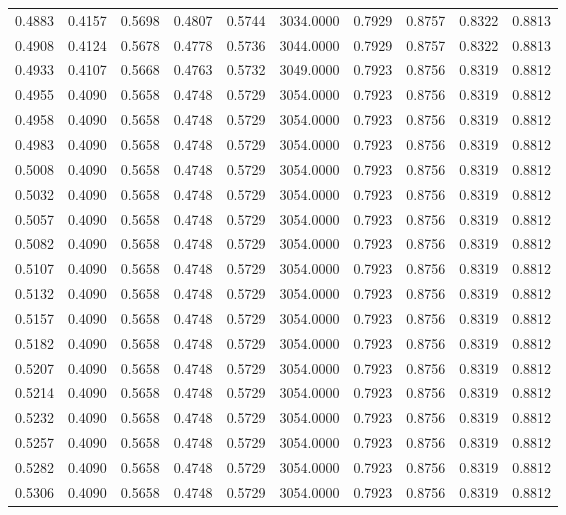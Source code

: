 \begin{tabular}{rrrrrrrrrr}
0.4883 & 0.4157 & 0.5698 & 0.4807 & 0.5744 & 3034.0000 & 0.7929 & 0.8757 & 0.8322 & 0.8813 \\
0.4908 & 0.4124 & 0.5678 & 0.4778 & 0.5736 & 3044.0000 & 0.7929 & 0.8757 & 0.8322 & 0.8813 \\
0.4933 & 0.4107 & 0.5668 & 0.4763 & 0.5732 & 3049.0000 & 0.7923 & 0.8756 & 0.8319 & 0.8812 \\
0.4955 & 0.4090 & 0.5658 & 0.4748 & 0.5729 & 3054.0000 & 0.7923 & 0.8756 & 0.8319 & 0.8812 \\
0.4958 & 0.4090 & 0.5658 & 0.4748 & 0.5729 & 3054.0000 & 0.7923 & 0.8756 & 0.8319 & 0.8812 \\
0.4983 & 0.4090 & 0.5658 & 0.4748 & 0.5729 & 3054.0000 & 0.7923 & 0.8756 & 0.8319 & 0.8812 \\
0.5008 & 0.4090 & 0.5658 & 0.4748 & 0.5729 & 3054.0000 & 0.7923 & 0.8756 & 0.8319 & 0.8812 \\
0.5032 & 0.4090 & 0.5658 & 0.4748 & 0.5729 & 3054.0000 & 0.7923 & 0.8756 & 0.8319 & 0.8812 \\
0.5057 & 0.4090 & 0.5658 & 0.4748 & 0.5729 & 3054.0000 & 0.7923 & 0.8756 & 0.8319 & 0.8812 \\
0.5082 & 0.4090 & 0.5658 & 0.4748 & 0.5729 & 3054.0000 & 0.7923 & 0.8756 & 0.8319 & 0.8812 \\
0.5107 & 0.4090 & 0.5658 & 0.4748 & 0.5729 & 3054.0000 & 0.7923 & 0.8756 & 0.8319 & 0.8812 \\
0.5132 & 0.4090 & 0.5658 & 0.4748 & 0.5729 & 3054.0000 & 0.7923 & 0.8756 & 0.8319 & 0.8812 \\
0.5157 & 0.4090 & 0.5658 & 0.4748 & 0.5729 & 3054.0000 & 0.7923 & 0.8756 & 0.8319 & 0.8812 \\
0.5182 & 0.4090 & 0.5658 & 0.4748 & 0.5729 & 3054.0000 & 0.7923 & 0.8756 & 0.8319 & 0.8812 \\
0.5207 & 0.4090 & 0.5658 & 0.4748 & 0.5729 & 3054.0000 & 0.7923 & 0.8756 & 0.8319 & 0.8812 \\
0.5214 & 0.4090 & 0.5658 & 0.4748 & 0.5729 & 3054.0000 & 0.7923 & 0.8756 & 0.8319 & 0.8812 \\
0.5232 & 0.4090 & 0.5658 & 0.4748 & 0.5729 & 3054.0000 & 0.7923 & 0.8756 & 0.8319 & 0.8812 \\
0.5257 & 0.4090 & 0.5658 & 0.4748 & 0.5729 & 3054.0000 & 0.7923 & 0.8756 & 0.8319 & 0.8812 \\
0.5282 & 0.4090 & 0.5658 & 0.4748 & 0.5729 & 3054.0000 & 0.7923 & 0.8756 & 0.8319 & 0.8812 \\
0.5306 & 0.4090 & 0.5658 & 0.4748 & 0.5729 & 3054.0000 & 0.7923 & 0.8756 & 0.8319 & 0.8812 \\

\end{tabular}

